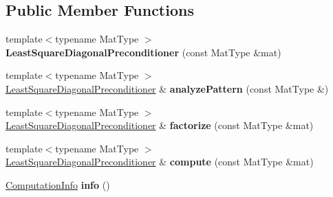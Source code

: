 \subsection*{Public Member Functions}
\begin{DoxyCompactItemize}
\item 
\mbox{\label{class_eigen_1_1_least_square_diagonal_preconditioner_a9fe093a3b038a1dc7628eced1aa00e39}} 
{\footnotesize template$<$typename Mat\+Type $>$ }\\{\bfseries Least\+Square\+Diagonal\+Preconditioner} (const Mat\+Type \&mat)
\item 
\mbox{\label{class_eigen_1_1_least_square_diagonal_preconditioner_af1d3a3dbe081bdb667a5596491d7ad47}} 
{\footnotesize template$<$typename Mat\+Type $>$ }\\\mbox{\hyperlink{class_eigen_1_1_least_square_diagonal_preconditioner}{Least\+Square\+Diagonal\+Preconditioner}} \& {\bfseries analyze\+Pattern} (const Mat\+Type \&)
\item 
\mbox{\label{class_eigen_1_1_least_square_diagonal_preconditioner_a831492d2cecddc28b48ce53ddb4bc295}} 
{\footnotesize template$<$typename Mat\+Type $>$ }\\\mbox{\hyperlink{class_eigen_1_1_least_square_diagonal_preconditioner}{Least\+Square\+Diagonal\+Preconditioner}} \& {\bfseries factorize} (const Mat\+Type \&mat)
\item 
\mbox{\label{class_eigen_1_1_least_square_diagonal_preconditioner_a05eb1d791e2265e9110ba3bb8d717cfe}} 
{\footnotesize template$<$typename Mat\+Type $>$ }\\\mbox{\hyperlink{class_eigen_1_1_least_square_diagonal_preconditioner}{Least\+Square\+Diagonal\+Preconditioner}} \& {\bfseries compute} (const Mat\+Type \&mat)
\item 
\mbox{\label{class_eigen_1_1_least_square_diagonal_preconditioner_a648044dd59ff3b09cf4efa7fe49d5208}} 
\mbox{\hyperlink{group__enums_ga85fad7b87587764e5cf6b513a9e0ee5e}{Computation\+Info}} {\bfseries info} ()
\end{DoxyCompactItemize}
